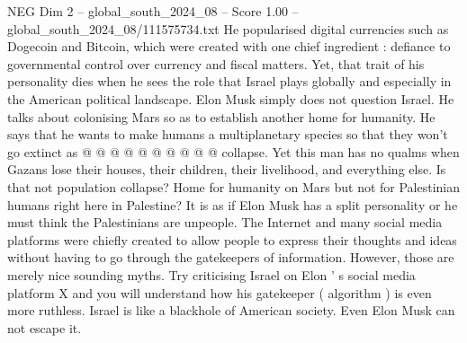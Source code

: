\begin{textsample}{NEG Dim 2 – global\_south\_2024\_08 – Score 1.00 – global\_south\_2024\_08/111575734.txt}
He popularised digital currencies such as Dogecoin and Bitcoin, which were created with one chief ingredient : defiance to governmental control over currency and fiscal matters.
Yet, that trait of his personality dies when he sees the role that Israel plays globally and especially in the American political landscape.
Elon Musk simply does not question Israel.
He talks about colonising Mars so as to establish another home for humanity.
He says that he wants to make humans a multiplanetary species so that they won't go extinct as @ @ @ @ @ @ @ @ @ @ collapse.
Yet this man has no qualms when Gazans lose their houses, their children, their livelihood, and everything else.
Is that not population collapse?
Home for humanity on Mars but not for Palestinian humans right here in Palestine?
It is as if Elon Musk has a split personality or he must think the Palestinians are unpeople.
The Internet and many social media platforms were chiefly created to allow people to express their thoughts and ideas without having to go through the gatekeepers of information.
However, those are merely nice sounding myths.
Try criticising Israel on Elon ' s social media platform X and you will understand how his gatekeeper ( algorithm ) is even more ruthless.
Israel is like a blackhole of American society.
Even Elon Musk can not escape it.

\end{textsample}
